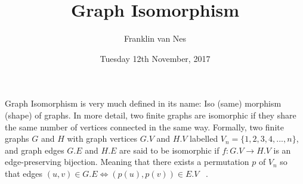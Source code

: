 \documentclass[11pt]{article}
\begin{document}
\title{Graph Isomorphism}
\author{Franklin van Nes}
\date{Tuesday 12th November, 2017}
\maketitle

Graph Isomorphism is very much defined in its name: Iso (same) morphism (shape) of graphs.
In more detail, two finite graphs are isomorphic if they share the same number of vertices connected in the same way.
Formally, two finite graphs $G$ and $H$ with graph vertices $G.V$ and $H.V$ labelled $V_n = \{1, 2, 3, 4, ... , n\}$, and graph edges $G.E$ and $H.E$
are said to be isomorphic if $f: G.V \rightarrow H.V$ is an edge-preserving bijection. Meaning
that there exists a permutation $p$ of $V_n$ so that edges $(u, v) \in G.E \iff (p(u), p(v)) \in E.V$ ~\cite{gary-definer}.

{}

\end{document}
